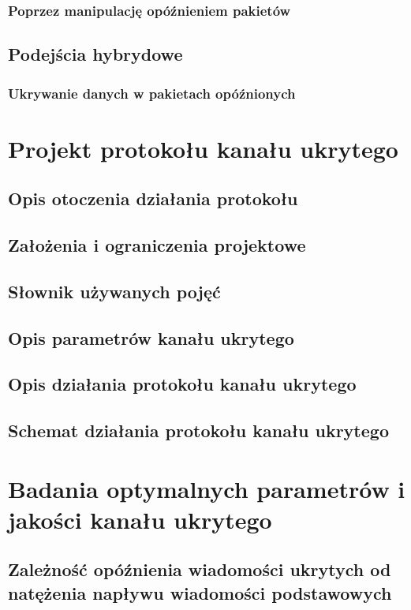 \documentclass[a4paper, twoside]{report}
\begin{document}
        \subsection{Poprzez manipulację opóźnieniem pakietów}

    \section{Podejścia hybrydowe}
        \subsection{Ukrywanie danych w pakietach opóźnionych}


\chapter{Projekt protokołu kanału ukrytego}
    \section{Opis otoczenia działania protokołu}
    \section{Założenia i ograniczenia projektowe}
    \section{Słownik używanych pojęć}
    \section{Opis parametrów kanału ukrytego}
    \section{Opis działania protokołu kanału ukrytego}
    \section{Schemat działania protokołu kanału ukrytego}

\chapter{Badania optymalnych parametrów i jakości kanału ukrytego}
    \section{Zależność opóźnienia wiadomości ukrytych od natężenia napływu wiadomości podstawowych}
\end{document}
